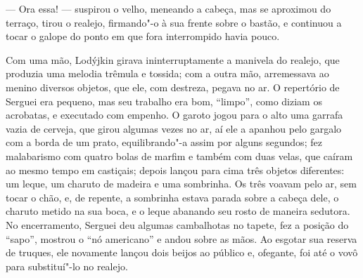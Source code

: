 --- Ora essa! --- suspirou o velho, meneando a cabeça, mas se aproximou
do terraço, tirou o realejo, firmando"-o à sua frente sobre o bastão, e
continuou a tocar o galope do ponto em que fora interrompido havia
pouco.



Com uma mão, Lodýjkin girava ininterruptamente a manivela do realejo,
que produzia uma melodia trêmula e tossida; com a outra mão, arremessava
ao menino diversos objetos, que ele, com destreza, pegava no ar. O
repertório de Serguei era pequeno, mas seu trabalho era bom, ``limpo'',
como diziam os acrobatas, e executado com empenho. O garoto jogou para o
alto uma garrafa vazia de cerveja, que girou algumas vezes no ar, aí ele
a apanhou pelo gargalo com a borda de um prato, equilibrando"-a assim por
alguns segundos; fez malabarismo com quatro bolas de marfim e também com
duas velas, que caíram ao mesmo tempo em castiçais; depois lançou para
cima três objetos diferentes: um leque, um charuto de madeira e uma
sombrinha. Os três voavam pelo ar, sem tocar o chão, e, de repente, a
sombrinha estava parada sobre a cabeça dele, o charuto metido na sua
boca, e o leque abanando seu rosto de maneira sedutora. No encerramento,
Serguei deu algumas cambalhotas no tapete, fez a posição do ``sapo'', mostrou o ``nó americano'' e andou sobre as mãos. Ao esgotar sua
reserva de truques, ele novamente lançou dois beijos ao público e,
ofegante, foi até o vovô para substituí"-lo no realejo.

